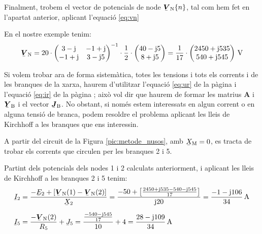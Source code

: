 Finalment,
trobem el vector de potencials de node $\mcmplx{V}\ped{N}\{n\}$, tal
com  hem fet en l'apartat anterior, aplicant l'equaci\'{o} \eqref{eq:vn}

En el nostre exemple tenim:
\[
   \mcmplx{V}\ped{N} =
   20 \cdot \begin{pmatrix}
         3 - \ju  & -1 + \ju \\ -1 + \ju & 3 - \ju 5
   \end{pmatrix} ^{-1} \cdot
   \frac{1}{2} \cdot \begin{pmatrix}
         40 - \ju 5 \\
         8 + \ju 5
   \end{pmatrix} =
   \frac{1}{17} \cdot \begin{pmatrix}
         2450 + \ju 535 \\ 540  + \ju 545
   \end{pmatrix}\unit{V}
\]

Si volem trobar ara de forma sistem\`{a}tica, totes les tensions i tots els corrents i  de les branques de la xarxa, haurem d'utilitzar l'equaci\'{o} \eqref{eq:ur} de la p\`{a}gina \pageref{eq:ur} i
l'equaci\'{o} \eqref{eq:ir} de la p\`{a}gina \pageref{eq:ir}; aix\`{o} vol dir que haurem de formar les matrius $\boldsymbol{A}$ i $\mcmplx{Y}\ped{B}$ i el vector $\mcmplx{J}\ped{B}$. No obstant, si nom\'{e}s estem interessats en algun corrent o en alguna tensi\'{o} de branca, podem resoldre el problema aplicant les lleis de Kirchhoff a les branques que ens interessin.

\begin{exemple}
A partir del circuit de la Figura \vref{pic:metode_nusos}, amb
$\cmplx{X}\ped{M}=0$, es tracta de trobar els corrents que circulen
per les branques 2 i 5.

Partint dels potencials dels nodes 1 i 2 calculats anteriorment, i aplicant les lleis de Kirchhoff a les branques 2 i 5 tenim:
\begin{align*}
   \cmplx{I}_2 &= \frac{-\cmplx{E}_2 + [\mcmplx{V}\ped{N}(1) - \mcmplx{V}\ped{N}(2)]}
                  {\cmplx{X}_2} = \frac{-50 + \left[\frac{2450+\ju 535 -540
                  - \ju 545}{17}\right]} {\ju 20} = \frac{-1 - \ju 106}{34}\unit{A} \\[1.5ex]
   \cmplx{I}_5 &=  \frac{- \mcmplx{V}\ped{N}(2)}{R_5}  + \cmplx{J}_5 =
                  \frac{\frac{-540 - \ju 545}{17}}{10} + 4 =
                  \frac{28 - \ju 109}{34}\unit{A}
\end{align*}

\end{exemple}

